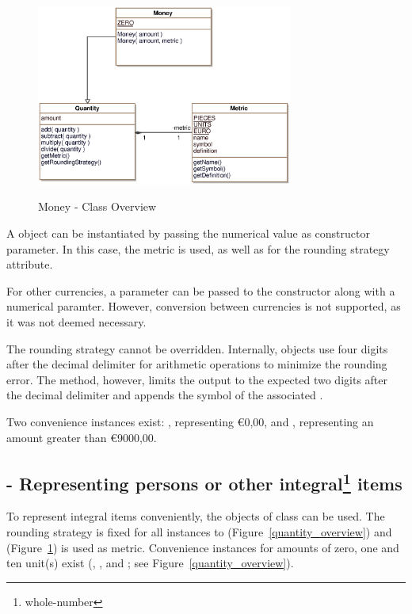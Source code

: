 \begin{figure}[ht]
	\centering
  \includegraphics[width=0.75\textwidth]{images/Money_Overview.eps}
	\label{money_overview}
	\caption{Money - Class Overview}
\end{figure}

A  object can be instantiated by passing the numerical value as constructor parameter.
In this case, the metric  is used, as well as  for the rounding strategy attribute.

For other currencies, a  parameter can be passed to the constructor along with a numerical paramter.
However, conversion between currencies is not supported, as it was not deemed necessary.

The rounding strategy cannot be overridden.
Internally,  objects use four digits after the decimal delimiter for arithmetic operations to minimize the rounding error.
The  method, however, limits the output to the expected two digits after the decimal delimiter and appends the symbol of the associated .

Two convenience instances exist: , representing \euro{0,00}, and , representing an amount greater than \euro{9000,00}.

\subsection[]{ - Representing persons or other integral\protect\footnote{whole-number} items}
To represent integral items conveniently, the objects of class  can be used.
The rounding strategy is fixed for all instances to  (Figure~\ref{quantity_overview}) and  (Figure~\ref{money_overview}) is used as metric.
Convenience instances for amounts of zero, one and ten unit(s) exist (, , and ; see Figure~\ref{quantity_overview}).
